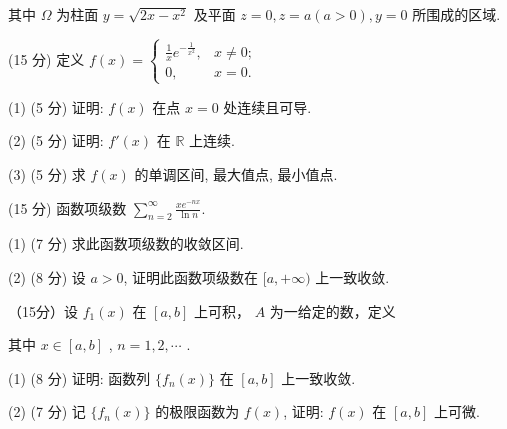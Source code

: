 其中 $\Omega$ 为柱面 $y = \sqrt{2x - x^2}$ 及平面 $z = 0, z = a (a > 0), y = 0$ 所围成的区域.\par
\par{}
(15 分) 定义 $f(x) = \begin{cases} \frac{1}{x} e^{-\frac{1}{x^2}}, & x \neq 0; \\ 0, & x = 0. \end{cases}$\par
(1) (5 分) 证明: $f(x)$ 在点 $x = 0$ 处连续且可导.\par
(2) (5 分) 证明: $f'(x)$ 在 $\mathbb{R}$ 上连续.\par
(3) (5 分) 求 $f(x)$ 的单调区间, 最大值点, 最小值点.\par
\par{}
(15 分) 函数项级数 $\sum_{n=2}^{\infty} \frac{xe^{-nx}}{\ln n}$.\par
(1) (7 分) 求此函数项级数的收敛区间.\par
(2) (8 分) 设 $a > 0$, 证明此函数项级数在 $[a, +\infty)$ 上一致收敛.\par
\par{}
\par{}
（15分）设 $f_{1}(x)$ 在 $[a,b]$ 上可积， $A$ 为一给定的数，定义\par
\nopagebreak[4]
其中  $x \in [a, b]$ ,  $n = 1, 2, \cdots$ .\par
(1) (8 分) 证明: 函数列 $\{f_n(x)\}$ 在 $[a, b]$ 上一致收敛.\par
(2) (7 分) 记 $\{f_n(x)\}$ 的极限函数为 $f(x)$, 证明: $f(x)$ 在 $[a, b]$ 上可微.\par
\par{}
